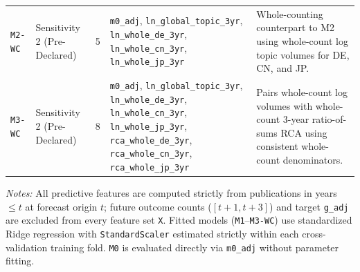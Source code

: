\begin{table}[htbp]
\begin{tabular}{>{\raggedright\arraybackslash}p{1.75cm} >{\raggedright\arraybackslash}p{2.05cm} c >{\raggedright\arraybackslash}p{4.75cm} >{\raggedright\arraybackslash}p{3.65cm}}
\addlinespace[3pt]
\texttt{M2-WC} & Sensitivity 2 (Pre-Declared) & 5 & \texttt{m0\_adj}, \texttt{ln\_global\_topic\_3yr}, \texttt{ln\_whole\_de\_3yr}, \texttt{ln\_whole\_cn\_3yr}, \texttt{ln\_whole\_jp\_3yr} & Whole-counting counterpart to M2 using whole-count log topic volumes for DE, CN, and JP. \\
\texttt{M3-WC} & Sensitivity 2 (Pre-Declared) & 8 & \texttt{m0\_adj}, \texttt{ln\_global\_topic\_3yr}, \texttt{ln\_whole\_de\_3yr}, \texttt{ln\_whole\_cn\_3yr}, \texttt{ln\_whole\_jp\_3yr}, \texttt{rca\_whole\_de\_3yr}, \texttt{rca\_whole\_cn\_3yr}, \texttt{rca\_whole\_jp\_3yr} & Pairs whole-count log volumes with whole-count 3-year ratio-of-sums RCA using consistent whole-count denominators. \\
\bottomrule
\end{tabular}

\vspace{4pt}
\parbox{14.8cm}{\scriptsize \textit{Notes:} All predictive features are computed strictly from publications in years $\le t$ at forecast origin $t$; future outcome counts ($[t+1, t+3]$) and target \texttt{g\_adj} are excluded from every feature set \texttt{X}. Fitted models (\texttt{M1}--\texttt{M3-WC}) use standardized Ridge regression with \texttt{StandardScaler} estimated strictly within each cross-validation training fold. \texttt{M0} is evaluated directly via \texttt{m0\_adj} without parameter fitting.}
\end{table}
